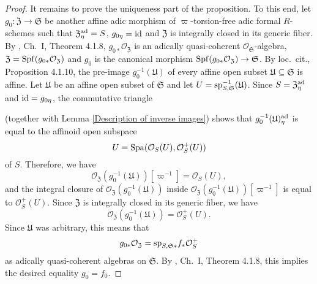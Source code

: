 \documentclass[12pt,twoside,a4paper]{article}
\theoremstyle{definition}
\theoremstyle{remark}
\newcommand\ad{{\rm ad}}
\newcommand\id{{\rm id}}
\newcommand\spc{{\rm sp}}
\newcommand\Spa{{\rm Spa}}
\newcommand\Spf{{\rm Spf}}
\begin{document}
\begin{proof}
It remains to prove the uniqueness part of the proposition. To this end, let $g_{0}: \mathfrak{Z}\to \mathfrak{S}$ be another affine adic morphism of $\varpi$-torsion-free adic formal $R$-schemes such that $\mathfrak{Z}_{\eta}^{\ad}=S$, $g_{0\eta}=\id$ and $\mathfrak{Z}$ is integrally closed in its generic fiber. By \cite{FK}, Ch.~I, Theorem 4.1.8, $g_{0\ast}\mathcal{O}_{\mathfrak{Z}}$ is an adically quasi-coherent $\mathcal{O}_{\mathfrak{S}}$-algebra, $\mathfrak{Z}=\Spf(g_{0\ast}\mathcal{O}_{\mathfrak{Z}})$ and $g_{0}$ is the canonical morphism $\Spf(g_{0\ast}\mathcal{O}_{\mathfrak{Z}})\to \mathfrak{S}$. By loc.~cit., Proposition 4.1.10, the pre-image $g_{0}^{-1}(\mathfrak{U})$ of every affine open subset $\mathfrak{U}\subseteq\mathfrak{S}$ is affine. Let $\mathfrak{U}$ be an affine open subset of $\mathfrak{S}$ and let $U=\spc_{S,\mathfrak{S}}^{-1}(\mathfrak{U})$. Since $S=\mathfrak{Z}_{\eta}^{\ad}$ and $\id=g_{0\eta}$, the commutative triangle \begin{center}\end{center}(together with Lemma \ref{Description of inverse images}) shows that $g_{0}^{-1}(\mathfrak{U})_{\eta}^{\ad}$ is equal to the affinoid open subspace \begin{equation*}U=\Spa(\mathcal{O}_{S}(U), \mathcal{O}_{S}^{+}(U))\end{equation*}of $S$. Therefore, we have \begin{equation*}\mathcal{O}_{\mathfrak{Z}}(g_{0}^{-1}(\mathfrak{U}))[\varpi^{-1}]=\mathcal{O}_{S}(U),\end{equation*}and the integral closure of $\mathcal{O}_{\mathfrak{Z}}(g_{0}^{-1}(\mathfrak{U}))$ inside $\mathcal{O}_{\mathfrak{Z}}(g_{0}^{-1}(\mathfrak{U}))[\varpi^{-1}]$ is equal to $\mathcal{O}_{S}^{+}(U)$. Since $\mathfrak{Z}$ is integrally closed in its generic fiber, we have \begin{equation*}\mathcal{O}_{\mathfrak{Z}}(g_{0}^{-1}(\mathfrak{U}))=\mathcal{O}_{S}^{+}(U).\end{equation*}Since $\mathfrak{U}$ was arbitrary, this means that \begin{equation*}g_{0\ast}\mathcal{O}_{\mathfrak{Z}}=\spc_{S,\mathfrak{S}\ast}f_{\ast}\mathcal{O}_{S}^{+}\end{equation*}as adically quasi-coherent algebras on $\mathfrak{S}$. By \cite{FK}, Ch.~I, Theorem 4.1.8, this implies the desired equality $g_{0}=f_{0}$.\end{proof}
\end{document}
